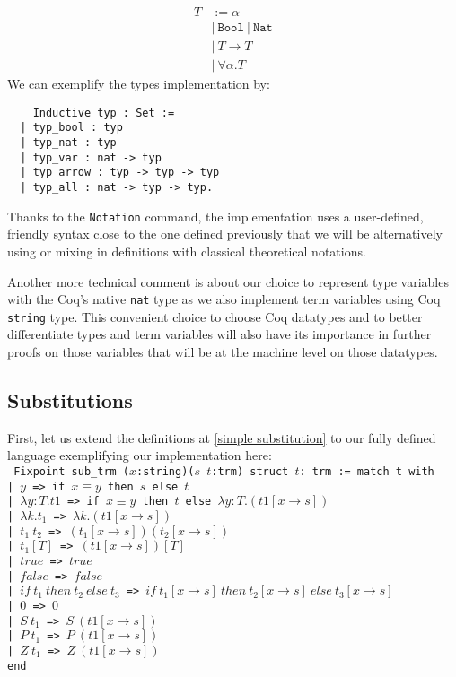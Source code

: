 \documentclass{article}
\begin{document}
    \begin{align}
        T &:= \alpha  \tag{Type variables}\\
        &| \ \texttt{Bool} \ | \ \texttt{Nat} \tag{Base types} \\
        &| \ T\rightarrow T \tag{Arrow types}\\
        &| \ \forall \alpha.T \tag{Quantified types}
    \end{align}
We can exemplify the types implementation by:\begin{verbatim}
    Inductive typ : Set :=
  | typ_bool : typ
  | typ_nat : typ
  | typ_var : nat -> typ
  | typ_arrow : typ -> typ -> typ
  | typ_all : nat -> typ -> typ.
\end{verbatim}
Thanks to the \texttt{Notation} command, the implementation uses a user-defined, friendly syntax close to the one defined previously that we will be alternatively using or mixing in definitions with classical theoretical notations.
\par Another more technical comment is about our choice to represent type variables with the Coq's native  \texttt{nat} type as we also implement term variables using Coq \texttt{string} type. This convenient choice to choose Coq datatypes and to better differentiate types and term variables will also have its importance in further proofs on those variables that will be at the machine level on those datatypes.

    \subsection{Substitutions}
    First, let us extend the definitions at \ref{simple substitution} to our fully defined language exemplifying our implementation here:\\
    \label{substitution1}\texttt{
Fixpoint sub\_trm ($x$:string)($s$ $t$:trm) {struct $t$}: trm := match t with\\
  | $y$ => if $x \equiv y$ then $s$ else $t$\\
  | $\lambda y : T . t1$ =>
        if $x\equiv y$ then $t$ else $\lambda y : T.(t1[x\rightarrow s])$\\
  | $\lambda k. t_1$ =>  $\lambda k. (t1[x\rightarrow s])$\\
  | $t_1 \ t_2$ =>  $(t_1[x\rightarrow s]) (t_2 [x\rightarrow s])$\\
  | $t_1 [ T ]$ => $(t1[x\rightarrow s]) [ T ]$\\
  | $true$ => $true$\\
  | $false$ => $false$\\
  | $if \ t_1 \ then \ t_2 \ else \ t_3$ => 
         $if \ t_1[x\rightarrow s] \ then \ t_2[x\rightarrow s] \ else \ t_3[x\rightarrow s]$\\
  | $0$ => $0$\\
  | $S \ t_1$ => $S \ (t1[x\rightarrow s])$\\
  | $P \ t_1$ => $P \ (t1[x\rightarrow s])$\\
  | $Z \ t_1$ => $Z \ (t1[x\rightarrow s])$\\
end
}
\end{document}
